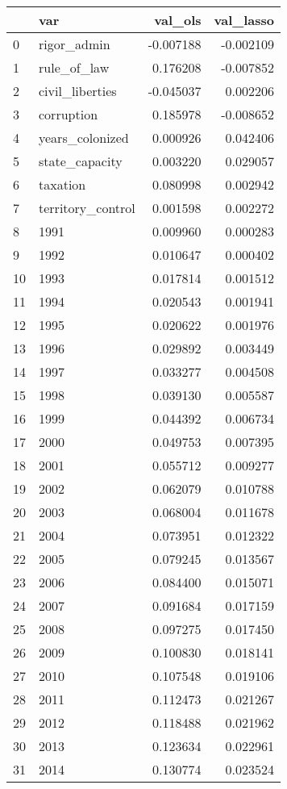 \begin{tabular}{llrr}
\toprule
 & var & val_ols & val_lasso \\
\midrule
0 & rigor_admin & -0.007188 & -0.002109 \\
1 & rule_of_law & 0.176208 & -0.007852 \\
2 & civil_liberties & -0.045037 & 0.002206 \\
3 & corruption & 0.185978 & -0.008652 \\
4 & years_colonized & 0.000926 & 0.042406 \\
5 & state_capacity & 0.003220 & 0.029057 \\
6 & taxation & 0.080998 & 0.002942 \\
7 & territory_control & 0.001598 & 0.002272 \\
8 & 1991 & 0.009960 & 0.000283 \\
9 & 1992 & 0.010647 & 0.000402 \\
10 & 1993 & 0.017814 & 0.001512 \\
11 & 1994 & 0.020543 & 0.001941 \\
12 & 1995 & 0.020622 & 0.001976 \\
13 & 1996 & 0.029892 & 0.003449 \\
14 & 1997 & 0.033277 & 0.004508 \\
15 & 1998 & 0.039130 & 0.005587 \\
16 & 1999 & 0.044392 & 0.006734 \\
17 & 2000 & 0.049753 & 0.007395 \\
18 & 2001 & 0.055712 & 0.009277 \\
19 & 2002 & 0.062079 & 0.010788 \\
20 & 2003 & 0.068004 & 0.011678 \\
21 & 2004 & 0.073951 & 0.012322 \\
22 & 2005 & 0.079245 & 0.013567 \\
23 & 2006 & 0.084400 & 0.015071 \\
24 & 2007 & 0.091684 & 0.017159 \\
25 & 2008 & 0.097275 & 0.017450 \\
26 & 2009 & 0.100830 & 0.018141 \\
27 & 2010 & 0.107548 & 0.019106 \\
28 & 2011 & 0.112473 & 0.021267 \\
29 & 2012 & 0.118488 & 0.021962 \\
30 & 2013 & 0.123634 & 0.022961 \\
31 & 2014 & 0.130774 & 0.023524 \\

\end{tabular}
